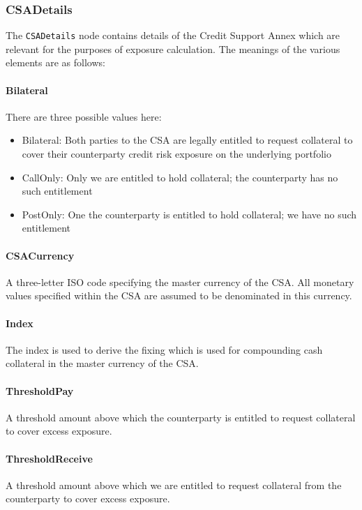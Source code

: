 \subsubsection*{CSADetails}

The \lstinline!CSADetails! node contains details of the Credit Support
Annex which are relevant for the purposes of exposure calculation. The
meanings of the various elements are as follows:

\paragraph{Bilateral} There are three possible values here:
\begin{itemize}
\item Bilateral: Both parties to the CSA are legally entitled to
  request collateral to cover their counterparty credit risk exposure
  on the underlying portfolio
\item CallOnly: Only we are entitled to hold collateral; the
  counterparty has no such entitlement
\item PostOnly: One the counterparty is entitled to hold collateral;
  we have no such entitlement
\end{itemize}

\paragraph{CSACurrency} A three-letter ISO code specifying the master
currency of the CSA. All monetary values specified within the CSA are
assumed to be denominated in this currency.

\paragraph{Index} The index is used to derive the fixing which is used
for compounding cash collateral in the master currency of the CSA.

\paragraph{ThresholdPay} A threshold amount above which the
counterparty is entitled to request collateral to cover excess
exposure.

\paragraph{ThresholdReceive} A threshold amount above which we are
entitled to request collateral from the counterparty to cover excess
exposure.

